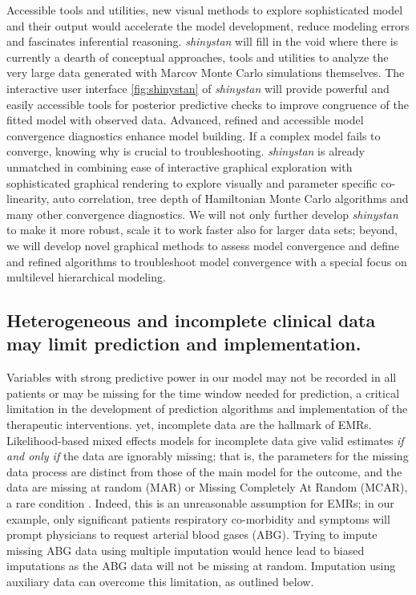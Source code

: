 \documentclass[11pt,notitlepage]{article}
\begin{document}
Accessible tools and utilities, new visual methods to explore sophisticated model and their output would accelerate the model development, reduce modeling errors and fascinates inferential reasoning. \textit{shinystan} will fill in the void where there is currently a dearth of conceptual approaches, tools and utilities to analyze the very large data generated with Marcov Monte Carlo simulations themselves. The interactive user interface \ref{fig:shinystan} of \textit{shinystan} will provide powerful and easily accessible tools for posterior predictive checks to improve congruence of the fitted model with observed data. Advanced, refined and accessible model convergence diagnostics enhance model building. If a complex model fails to converge, knowing why is crucial to troubleshooting. \textit{shinystan} is already unmatched in combining ease of interactive graphical exploration with sophisticated graphical rendering to explore visually and parameter specific co-linearity, auto correlation, tree depth of Hamiltonian Monte Carlo algorithms and many other convergence diagnostics. We will not only further develop \textit{shinystan} to make it more robust, scale it to work faster also for larger data sets; beyond, we will develop novel graphical methods to assess model convergence and define and refined algorithms to troubleshoot model convergence with a special focus on multilevel hierarchical modeling. 

 

\subsection*{Heterogeneous and incomplete clinical data may limit prediction and implementation.}
Variables with strong predictive power in our model may not be recorded in all patients or may be missing for the time window needed for prediction, a critical limitation in the development of prediction algorithms and implementation of the therapeutic interventions. yet, incomplete data are the hallmark of EMRs. Likelihood-based mixed effects models for incomplete data give valid estimates \textit{if and only if } the data are ignorably missing; that is, the parameters for the missing data process are distinct from those of the main model for the outcome, and the data are missing at random (MAR) or Missing Completely At Random (MCAR), a rare condition \cite{Rubin1976}. Indeed, this is an unreasonable assumption for EMRs; in our example, only significant patients respiratory co-morbidity and symptoms will prompt physicians to request arterial blood gases (ABG). Trying to impute missing ABG data using multiple imputation would  hence lead to biased imputations as the ABG data will not be missing at random. Imputation using auxiliary data can overcome this limitation, as outlined below.
\end{document}
